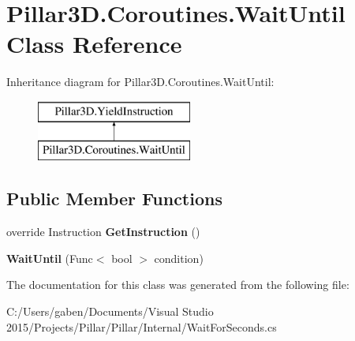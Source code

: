 \hypertarget{class_pillar3_d_1_1_coroutines_1_1_wait_until}{}\section{Pillar3\+D.\+Coroutines.\+Wait\+Until Class Reference}
\label{class_pillar3_d_1_1_coroutines_1_1_wait_until}
Inheritance diagram for Pillar3\+D.\+Coroutines.\+Wait\+Until\+:\begin{figure}[H]
\begin{center}
\leavevmode
\includegraphics[height=2.000000cm]{class_pillar3_d_1_1_coroutines_1_1_wait_until}
\end{center}
\end{figure}
\subsection*{Public Member Functions}
\begin{DoxyCompactItemize}
\item 
\mbox{\label{class_pillar3_d_1_1_coroutines_1_1_wait_until_a400f383b129ff0ec9845936c74a3d4b1}} 
override Instruction {\bfseries Get\+Instruction} ()
\item 
\mbox{\label{class_pillar3_d_1_1_coroutines_1_1_wait_until_a12236029f97f334f0aa7d670ece9d3b1}} 
{\bfseries Wait\+Until} (Func$<$ bool $>$ condition)
\end{DoxyCompactItemize}


The documentation for this class was generated from the following file\+:\begin{DoxyCompactItemize}
\item 
C\+:/\+Users/gaben/\+Documents/\+Visual Studio 2015/\+Projects/\+Pillar/\+Pillar/\+Internal/Wait\+For\+Seconds.\+cs\end{DoxyCompactItemize}
